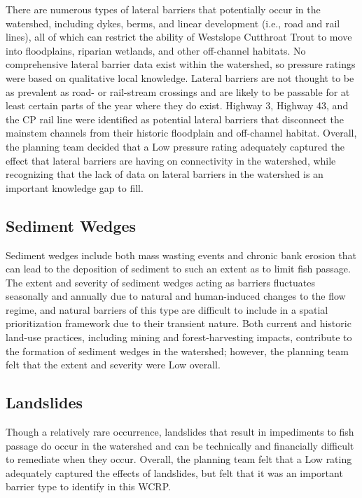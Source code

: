 \documentclass[
  letterpaper,
  DIV=11,
  numbers=noendperiod]{scrreprt}
\begin{document}
There are numerous types of lateral barriers that potentially occur in
the watershed, including dykes, berms, and linear development (i.e.,
road and rail lines), all of which can restrict the ability of Westslope
Cutthroat Trout to move into floodplains, riparian wetlands, and other
off-channel habitats. No comprehensive lateral barrier data exist within
the watershed, so pressure ratings were based on qualitative local
knowledge. Lateral barriers are not thought to be as prevalent as road-
or rail-stream crossings and are likely to be passable for at least
certain parts of the year where they do exist. Highway 3, Highway 43,
and the CP rail line were identified as potential lateral barriers that
disconnect the mainstem channels from their historic floodplain and
off-channel habitat. Overall, the planning team decided that a Low
pressure rating adequately captured the effect that lateral barriers are
having on connectivity in the watershed, while recognizing that the lack
of data on lateral barriers in the watershed is an important knowledge
gap to fill.

\subsection*{Sediment Wedges}\label{sediment-wedges}

Sediment wedges include both mass wasting events and chronic bank
erosion that can lead to the deposition of sediment to such an extent as
to limit fish passage. The extent and severity of sediment wedges acting
as barriers fluctuates seasonally and annually due to natural and
human-induced changes to the flow regime, and natural barriers of this
type are difficult to include in a spatial prioritization framework due
to their transient nature. Both current and historic land-use practices,
including mining and forest-harvesting impacts, contribute to the
formation of sediment wedges in the watershed; however, the planning
team felt that the extent and severity were Low overall.

\subsection*{Landslides}\label{landslides}

Though a relatively rare occurrence, landslides that result in
impediments to fish passage do occur in the watershed and can be
technically and financially difficult to remediate when they occur.
Overall, the planning team felt that a Low rating adequately captured
the effects of landslides, but felt that it was an important barrier
type to identify in this WCRP.
\end{document}
